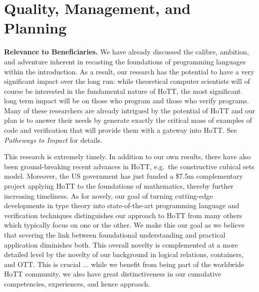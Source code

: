 \documentclass[a4paper,11pt]{article}
\newcommand{\eg}{{e.g.}\ }
\begin{document}
\section{Quality, Management, and Planning}

\vspace*{-0.1in}


{\bf Relevance to Beneficiaries.} We have already discussed the
calibre, ambition, and adventure inherent in recasting the foundations
of programming languages within the 
introduction. As a result, our research has the potential to have a
very significant impact over the long run: while theoretical computer
scientists will of course be interested in the fundamental nature of
HoTT, the most significant long term impact will be on those who
program and those who verify programs. Many of these researchers are
already intrigued by the potential of HoTT and our plan is to answer
their needs by generate
exactly the critical mass of examples of code and verification that
will provide them with a gateway into HoTT. See {\em Patheways to
  Impact} for details.


 This research is extremely timely.
In addition to our own results, there have also been ground-breaking
recent advances in HoTT, \eg the constructive cubical sets model.  Moreover, the
US government has just funded a \$7.5m complementary project applying
HoTT to the foundations of mathematics, thereby further increasing
timeliness. As for novely, our goal of turning cutting-edge
developments in type theory into state-of-the-art programming language
and verification techniques distinguishes our approach to HoTT from
many others which typically focus on one or the other. We make this
our goal as we believe that severing the link between foundational
understanding and practical application diminishes both. This overall
novelty is complemented at a more detailed level by the novelty of our
background in logical relations, containers, and OTT. This is crucial
... while we benefit from being part of the worldwide HoTT community,
we also have great distinctiveness in our cumulative
competencies, experiences, and hence approach.
 
\end{document}
